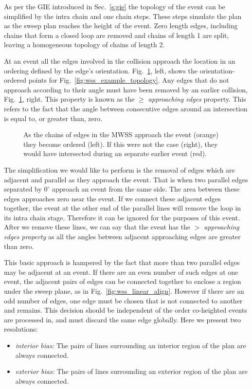 As per the GIE introduced in Sec.~\ref{s:gie} the topology of the event can be simplified by the intra chain and one chain steps. These steps simulate the plan as the sweep plan reaches the height of the event. Zero length edges, including chains that form a closed loop are removed and chains of length 1 are split, leaving a homogeneous topology of chains of length 2.

At an event all the edges involved in the collision approach the location in an ordering defined by the edge's orientation. Fig.~\ref{fig:wss_ordered_point}, left, shows the orientation-ordered points for Fig.~\ref{fig:wss_example_topology}. Any edges that do not approach according to their angle must have been removed by an earlier collision, Fig.~\ref{fig:wss_ordered_point}, right. This property is known as the \emph{$\ge$ approaching edges} property. This refers to the fact that the angle between consecutive edges around an intersection is equal to, or greater than, zero.

\begin{figure}
  \centering
  \def\svgwidth{1.0\columnwidth}
  
  \caption[Ordering chains around the event]{\label{fig:wss_ordered_point} As the chains of edges in the MWSS approach the event (orange) they become ordered (left). If this were not the case (right), they would have intersected during an separate earlier event (red).}
\end{figure}

The simplification we would like to perform is the removal of edges which are adjacent and parallel as they approach the event. That is when two parallel edges separated by $0^{\circ}$ approach an event from the same side. The area between these edges approaches zero near the event. If we connect these adjacent edges together, the event at the other end of the parallel lines will remove the loop in its intra chain stage. Therefore it can be ignored for the purposes of this event. After we remove these lines, we can say that the event has the \emph{$>$ approaching edges property} as all the angles between adjacent approaching edges are greater than zero.

This basic approach is hampered by the fact that more than two parallel edges may be adjacent at an event. If there are an even number of such edges at one event, the adjacent pairs of edges can be connected together to enclose a region under the sweep plane, as in Fig.~\ref{fig:wss_linear_align}. However if there are an odd number of edges, one edge must be chosen that is not connected to another and remains. This decision should be independent of the order co-heighted events are processed in, and must discard the same edge globally. Here we present two resolutions:
\begin{itemize}
\item{\emph{interior bias:} The pairs of lines surrounding an interior region of the plan are always connected.}
\item{\emph{exterior bias:} The pairs of lines surrounding an exterior region of the plan are always connected.}
\end{itemize}


